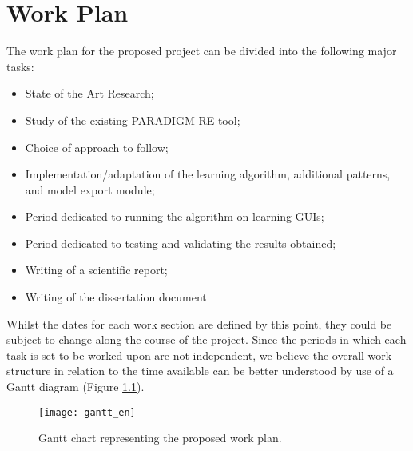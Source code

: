 \chapter{Work Plan} \label{chap:workplan}





The work plan for the proposed project can be divided into the following major tasks:
\begin{itemize}
\item State of the Art Research;
\item Study of the existing PARADIGM-RE tool;
\item Choice of approach to follow;
\item Implementation/adaptation of the learning algorithm, additional patterns, and model export module;
\item Period dedicated to running the algorithm on learning GUIs;
\item Period dedicated to testing and validating the results obtained;
\item Writing of a scientific report;
\item Writing of the dissertation document
\end{itemize}

Whilst the dates for each work section are defined by this point, they could be subject to change along the course of the project. Since the periods in which each task is set to be worked upon are not independent, we believe the overall work structure in relation to the time available can be better understood by use of a Gantt diagram (Figure \ref{fig:gantt}).

\begin{figure}[!ht]
  \begin{center}
    \texttt{[image: gantt\_en]}
  \end{center}
   \caption{Gantt chart representing the proposed work plan.}
  \label{fig:gantt}
\end{figure}

